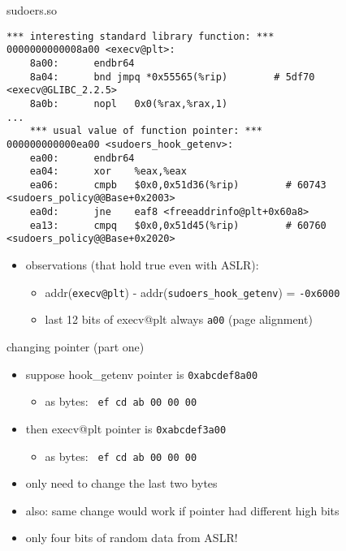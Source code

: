 \begin{frame}[fragile,label=sudoersSoCode]{sudoers.so}
\begin{lstlisting}[language={},style=smaller]
    *** interesting standard library function: ***
0000000000008a00 <execv@plt>:
    8a00:      endbr64 
    8a04:      bnd jmpq *0x55565(%rip)        # 5df70 <execv@GLIBC_2.2.5>
    8a0b:      nopl   0x0(%rax,%rax,1)
...
    *** usual value of function pointer: ***
000000000000ea00 <sudoers_hook_getenv>:
    ea00:      endbr64 
    ea04:      xor    %eax,%eax
    ea06:      cmpb   $0x0,0x51d36(%rip)        # 60743 <sudoers_policy@@Base+0x2003>
    ea0d:      jne    eaf8 <freeaddrinfo@plt+0x60a8>
    ea13:      cmpq   $0x0,0x51d45(%rip)        # 60760 <sudoers_policy@@Base+0x2020>
\end{lstlisting}
\begin{itemize}
\item<2-> observations (that hold true even with ASLR):
    \begin{itemize}
    \item addr(\texttt{execv@plt}) - addr(\texttt{sudoers\_hook\_getenv}) = \texttt{-0x6000}
    \item last 12 bits of execv@plt always \texttt{a00} (page alignment)
    \end{itemize}
\end{itemize}
\end{frame}

\begin{frame}{changing pointer (part one)}
\begin{itemize}
\item suppose hook\_getenv pointer is \texttt{0xabcdef8a00}
    \begin{itemize}
    \item as bytes: \texttt{ ef cd ab 00 00 00}
    \end{itemize}
\item then execv@plt pointer is \texttt{0xabcdef3a00}
    \begin{itemize}
    \item as bytes: \texttt{ ef cd ab 00 00 00}
    \end{itemize}
\vspace{.5cm}
\item only need to change the last two bytes
\item also: same change would work if pointer had different high bits
\item<2-> only four bits of random data from ASLR!
\end{itemize}
\end{frame}

